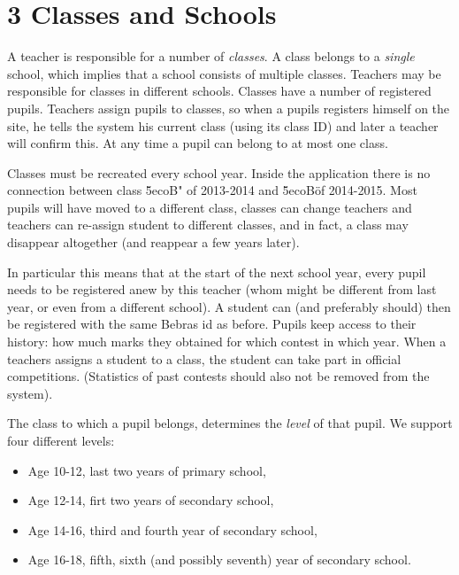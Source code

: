 
\section*{3 Classes and Schools}

A teacher is responsible for a number of \emph{classes}. A class belongs to a \emph{single} school, which implies that a school consists of multiple classes. Teachers may be responsible for classes in different schools. Classes have a number of registered pupils. Teachers assign pupils to classes, so when a pupils registers himself on the site, he tells the system his current class (using its class ID) and later a teacher will confirm this. At any time a pupil can belong to at most one class. 

Classes must be recreated every school year. Inside the application there is no connection between class \"5ecoB" of 2013-2014 and \"5ecoB\" of 2014-2015. Most pupils will have moved to a different class, classes can change teachers and teachers can re-assign student to different classes, and in fact, a class may disappear altogether (and reappear a few years later).

In particular this means that at the start of the next school year, every pupil needs to be registered anew by this teacher (whom might be different from last year, or even from a different school). A student can (and preferably should) then be registered with the same Bebras id as before. Pupils keep access to their history: how much marks they obtained for which contest in which year. 
When a teachers assigns a student to a class, the student can take part in official competitions.
(Statistics of past contests should also not be removed from the system).

The class to which a pupil belongs, determines the \emph{level} of that pupil. We support four different levels:
\begin{itemize}
\item Age 10-12, last two years of primary school,
\item Age 12-14, firt two years of secondary school,
\item Age 14-16, third and fourth year of secondary school,
\item Age 16-18, fifth, sixth (and possibly seventh) year of secondary school.
\end{itemize}
